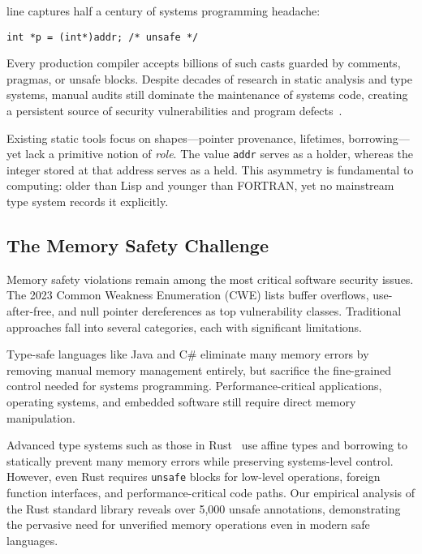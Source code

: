 \documentclass[journal]{IEEEtran}
\begin{document}
 line captures half a century of systems programming headache:

\begin{verbatim}
int *p = (int*)addr; /* unsafe */
\end{verbatim}

Every production compiler accepts billions of such casts guarded by comments, pragmas, or unsafe blocks. Despite decades of research in static analysis and type systems, manual audits still dominate the maintenance of systems code, creating a persistent source of security vulnerabilities and program defects~\cite{serebryany2012addresssanitizer}.

Existing static tools focus on shapes—pointer provenance, lifetimes, borrowing—yet lack a primitive notion of \emph{role}. The value \texttt{addr} serves as a holder, whereas the integer stored at that address serves as a held. This asymmetry is fundamental to computing: older than Lisp and younger than FORTRAN, yet no mainstream type system records it explicitly.

\subsection{The Memory Safety Challenge}

Memory safety violations remain among the most critical software security issues. The 2023 Common Weakness Enumeration (CWE) lists buffer overflows, use-after-free, and null pointer dereferences as top vulnerability classes. Traditional approaches fall into several categories, each with significant limitations.

Type-safe languages like Java and C\# eliminate many memory errors by removing manual memory management entirely, but sacrifice the fine-grained control needed for systems programming. Performance-critical applications, operating systems, and embedded software still require direct memory manipulation.

Advanced type systems such as those in Rust~\cite{matsakis2014rust} use affine types and borrowing to statically prevent many memory errors while preserving systems-level control. However, even Rust requires \texttt{unsafe} blocks for low-level operations, foreign function interfaces, and performance-critical code paths. Our empirical analysis of the Rust standard library reveals over 5,000 unsafe annotations, demonstrating the pervasive need for unverified memory operations even in modern safe languages.
\end{document}
